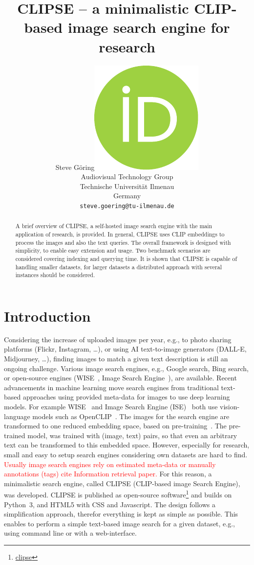 \documentclass{article}
\title{CLIPSE -- a minimalistic CLIP-based image search engine for research}
\author{ Steve Göring\hspace{1mm}\href{https://orcid.org/0000-0001-6810-6969}{\includegraphics[scale=0.06]{orcid.pdf}}\\
    Audiovisual Technology Group\\
    Technische Universität Ilmenau\\
    Germany \\
    \texttt{steve.goering@tu-ilmenau.de} \\
}
\begin{document}
\maketitle

\begin{abstract}
A brief overview of CLIPSE, a self-hosted image search engine with the main application of research, is provided.
In general, CLIPSE uses CLIP embeddings to process the images and also the text queries.
The overall framework is designed with simplicity, to enable easy extension and usage.
Two benchmark scenarios are considered covering indexing and querying time.
It is shown that CLIPSE is capable of handling smaller datasets, for larger datasets a distributed approach with several instances should be considered.
\end{abstract}




\section{Introduction}
Considering the increase of uploaded images per year, e.g., to photo sharing platforms (Flickr, Instagram, \ldots), or using AI text-to-image generators (DALL-E, Midjourney, \ldots), finding images to match a given text description is still an ongoing challenge.
Various image search engines, e.g., Google search, Bing search, or open-source engines (WISE~\cite{wise}, Image Search Engine~\cite{ise}), are available.
Recent advancements in machine learning move search engines from traditional text-based approaches using provided meta-data for images to use deep learning models.
For example WISE~\cite{wise} and Image Search Engine (ISE)~\cite{ise} both use vision-language models such as OpenCLIP~\cite{ilharco_gabriel_2021_5143773,cherti2023reproducible,Radford2021LearningTV,schuhmann2022laionb}.
The images for the search engine are transformed to one reduced embedding space, based on pre-training~\cite{Radford2021LearningTV}.
The pre-trained model, was trained with (image, text) pairs, so that even an arbitrary text can be transformed to this embedded space.
However, especially for research, small and easy to setup search engines considering own datasets are hard to find.
\textcolor{red}{Usually image search engines rely on estimated meta-data or manually annotations (tags) cite Information retrieval paper.}
For this reason, a minimalistic search engine, called CLIPSE (CLIP-based image Search Engine), was developed.
CLIPSE is published as open-source software\footnote{\url{clipse}} and builds on Python~3, and HTML5 with CSS and Javascript.
The design follows a simplification approach, therefor everything is kept as simple as possible.
This enables to perform a simple text-based image search for a given dataset, e.g., using command line or with a web-interface.
\end{document}
